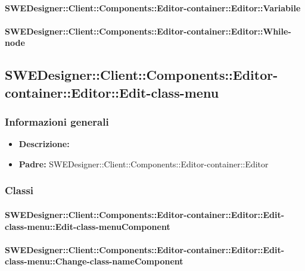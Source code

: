 			\paragraph{SWEDesigner::Client::Components::Editor-container::Editor::Variabile}
				
				
			\paragraph{SWEDesigner::Client::Components::Editor-container::Editor::While-node}
				
				
	\subsection{SWEDesigner::Client::Components::Editor-container::Editor::Edit-class-menu}
		\subsubsection{Informazioni generali}
			\begin{itemize}
          		\item \textbf{Descrizione:}\\
          		
          		\item \textbf{Padre:} SWEDesigner::Client::Components::Editor-container::Editor
          	\end{itemize}

         \subsubsection{Classi}
         
         	\paragraph{SWEDesigner::Client::Components::Editor-container::Editor::Edit-class-menu::Edit-class-menuComponent}
				
				
			\paragraph{SWEDesigner::Client::Components::Editor-container::Editor::Edit-class-menu::Change-class-nameComponent}
				
				

